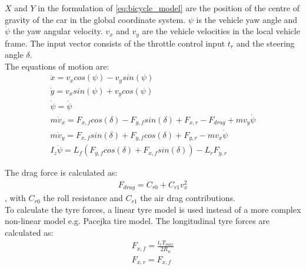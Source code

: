 $X$ and $Y$ in the formulation of \ref{eq:bicycle_model} are the position of the centre of gravity of the car in the global coordinate system. $\psi$ is the vehicle yaw angle and $\dot{\psi}$ the yaw angular velocity. $v_x$ and $v_y$ are the vehicle velocities in the local vehicle frame. The input vector consists of the throttle control input $t_r$ and the steering angle $\delta$.\\

The equations of motion \cite{TongDuySon2019} are:
\begin{equation}\label{eq:bicycle_model_eqmotion}
\begin{aligned}
\dot{x} = v_x cos(\psi) - v_y sin(\psi)\\
\dot{y} = v_x sin(\psi) + v_y cos(\psi)\\
\dot{\psi} = \dot{\psi}\\
m \dot{v}_x = F_{x,f} cos(\delta) - F_{y,f} sin(\delta) + F_{x,r} - F_{drag} + m v_y \dot{\psi}\\
m \dot{v}_y = F_{x,f} sin(\delta) + F_{y,f} cos(\delta) + F_{y,r} - m v_x \dot{\psi}\\
I_z \ddot{\psi} = L_f (F_{y,f} cos(\delta) + F_{x,f} sin(\delta)) - L_r F_{y,r}
\end{aligned}
\end{equation}

The drag force is calculated as:
\begin{equation}\label{eq:bicycle_Fdrag}
\begin{aligned}
F_{drag} = C_{r0} + C_{r1} v_x^2
\end{aligned}
\end{equation},
with $C_{r0}$ the roll resistance and $C_{r1}$ the air drag contributions.\\

To calculate the tyre forces, a linear tyre model is used instead of a more complex non-linear model e.g. Pacejka tire model. The longitudinal tyre forces are calculated as:
\begin{equation}\label{eq:bicycle_Fx}
\begin{aligned}
F_{x,f} = \frac{t_r T_{max}}{2 R_w}\\
F_{x,r} = F_{x, f}
\end{aligned}
\end{equation}

